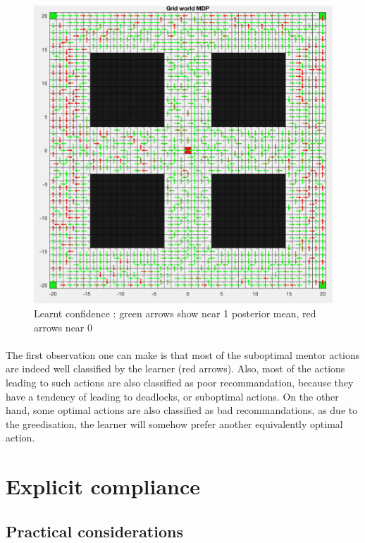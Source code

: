 \documentclass[a4paper]{report}
\begin{document}
{{{{\begin{figure}[h!]
\begin{minipage}{0.5\linewidth}
\begin{center}
							\includegraphics[width=0.95\linewidth]{heatmap_confidence_50}
							\caption{Learnt confidence : green arrows show near 1 posterior mean, red arrows near 0}
							\label{fig::heatmap_confidence_50}
						\end{center}
					\end{minipage}
				\end{figure}
				
				\paragraph{} The first observation one can make is that most of the suboptimal mentor actions are indeed well classified by the learner (red arrows). Also, most of the actions leading to such actions are also classified as poor recommandation, because they have a tendency of leading to deadlocks, or suboptimal actions. On the other hand, some optimal actions are also classified as bad recommandations, as due to the greedisation, the learner will somehow prefer another equivalently optimal action. 
			}
		}
		\section{Explicit compliance}
		{
		
			\subsection{Practical considerations}
			{
}}}}
\end{document}
